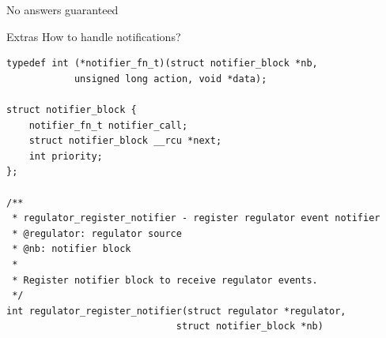 \documentclass[10pt]{beamer}
\begin{document}
\begin{frame}{No answers guaranteed}
\center
{}
\end{frame}

\addtocounter{framenumber}{-1}
\begin{frame}{Extras}
\lstset{language=C}
\scriptsize
How to handle notifications?
\begin{lstlisting}
typedef int (*notifier_fn_t)(struct notifier_block *nb,
			unsigned long action, void *data);

struct notifier_block {
	notifier_fn_t notifier_call;
	struct notifier_block __rcu *next;
	int priority;
};

/**
 * regulator_register_notifier - register regulator event notifier
 * @regulator: regulator source
 * @nb: notifier block
 *
 * Register notifier block to receive regulator events.
 */
int regulator_register_notifier(struct regulator *regulator,
                              struct notifier_block *nb) 
\end{lstlisting}
\end{frame}
\end{document}
